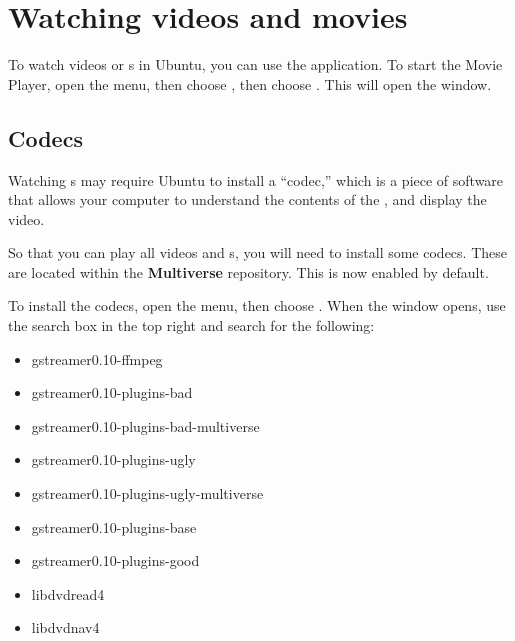 
\section{Watching videos and movies}

To watch videos or s in Ubuntu, you can use the 
application. To start the Movie Player, open the  menu, then 
choose , then choose . This will open the 
 window.


\subsection{Codecs}

Watching s may require Ubuntu to install a ``codec,'' which is a piece
of software that allows your computer to understand the contents of the , and
display the video.


So that you can play all videos and s, you will need to install some codecs. 
These are located within the \textbf{Multiverse} repository. This is now enabled by default.

To install the codecs, open the  menu, then
choose . When the  
window opens, use the search box in the top right and search for the following:

\begin{itemize}
  \item gstreamer0.10-ffmpeg
  \item gstreamer0.10-plugins-bad
  \item gstreamer0.10-plugins-bad-multiverse
  \item gstreamer0.10-plugins-ugly
  \item gstreamer0.10-plugins-ugly-multiverse
  \item gstreamer0.10-plugins-base
  \item gstreamer0.10-plugins-good
  \item libdvdread4
  \item libdvdnav4
\end{itemize}

